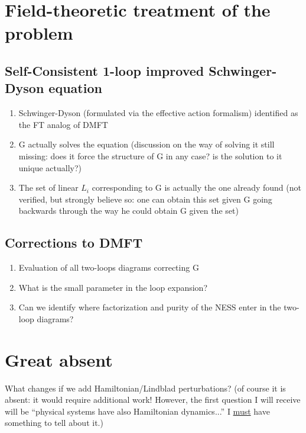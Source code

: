 \documentclass[a4paper,10pt]{article}
\theoremstyle{remark}
\begin{document}
  \section{Field-theoretic treatment of the problem} 
   \subsection{Self-Consistent 1-loop improved Schwinger-Dyson equation}
    \begin{enumerate}
     \item Schwinger-Dyson (formulated via the effective action formalism) identified as the FT analog of DMFT
     \item G actually solves the equation (discussion on the way of solving it still missing: does it force the structure of G in any case? is the solution to it unique actually?)
     \item The set of linear $L_i$ corresponding to G is actually the one already found (not verified, but strongly believe so: one can obtain this set given G going backwards through the way he could obtain G given the set)
    \end{enumerate} 
   \subsection{Corrections to DMFT}
    \begin{enumerate}
     \item Evaluation of all two-loops diagrams correcting G
     \item What is the small parameter in the loop expansion?
     \item Can we identify where factorization and purity of the NESS enter in the two-loop diagrams?
    \end{enumerate}

  \section{Great absent}
    What changes if we add Hamiltonian/Lindblad perturbations? (of course it is absent: it would require additional work! However, the first question I will receive will be ``physical systems have also Hamiltonian dynamics...'' I \underline{must} have something to tell about it.)
    
\end{document}
